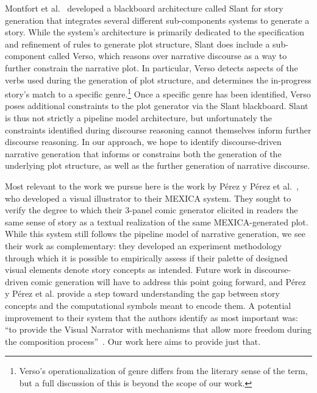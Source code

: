 Montfort et al.~\cite{montfort2013slant} developed a blackboard
architecture called Slant for story generation that integrates several
different sub-components systems to generate a story. While the system's
architecture is primarily dedicated to the specification and refinement of
rules to generate plot structure, Slant does include a sub-component called
Verso, which reasons over narrative discourse as a way to further constrain
the narrative plot. In particular, Verso detects aspects of the verbs used
during the generation of plot structure, and determines the in-progress
story's match to a specific genre.\footnote{Verso's operationalization of
genre differs from the literary sense of the term, but a full discussion of
this is beyond the scope of our work.} Once a specific genre has been
identified, Verso poses additional constraints to the plot generator via
the Slant blackboard. Slant is thus not strictly a pipeline model
architecture, but unfortunately the constraints identified during discourse
reasoning cannot themselves inform further discourse reasoning. In our
approach, we hope to identify discourse-driven narrative generation that
informs or constrains both the generation of the underlying plot structure,
as well as the further generation of narrative discourse.

Most relevant to the work we pursue here is the work by P\'erez y P\'erez
et al.~\cite{perezyperez2012illustrating}, who developed a visual
illustrator to their MEXICA system. They sought to verify the degree to
which their 3-panel comic generator elicited in readers the same sense of
story as a textual realization of the same MEXICA-generated plot. While
this system still follows the pipeline model of narrative generation, we
see their work as complementary: they developed an experiment methodology
through which it is possible to empirically assess if their palette of
designed visual elements denote story concepts as intended.  Future work in
discourse-driven comic generation will have to address this point going
forward, and P\'erez y P\'erez et al. provide a step toward understanding
the gap between story concepts and the computational symbols meant to
encode them. A potential improvement to their system that the authors
identify as most important was: ``to provide the Visual Narrator with
mechanisms that allow more freedom during the composition
process''~\cite{perezyperez2012illustrating}. Our work here aims to provide
just that.



